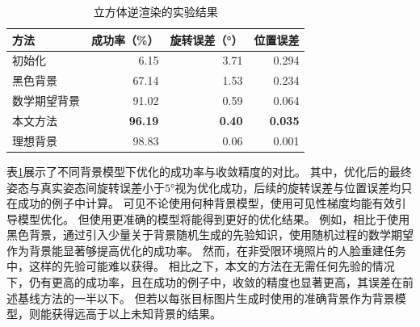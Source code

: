 \begin{table}
    \centering
    \caption{立方体逆渲染的实验结果}
    \label{tab:cube_opt}
    \begin{tabular}{l|rrr}
        \toprule
        方法       & 成功率（\%） & 旋转误差（°） & 位置误差 \\
        \midrule
        初始化      &  6.15 & 3.71 & 0.294 \\
        黑色背景    & 67.14 & 1.53 & 0.234 \\
        数学期望背景& 91.02 & 0.59 & 0.064 \\
        本文方法    & \textbf{96.19} & \textbf{0.40} & \textbf{0.035} \\
        \midrule
        理想背景    & 98.83 & 0.06 & 0.001 \\
        \bottomrule
    \end{tabular}
\end{table}
表\ref{tab:cube_opt}展示了不同背景模型下优化的成功率与收敛精度的对比。
其中，优化后的最终姿态与真实姿态间旋转误差小于$5°$视为优化成功，后续的旋转误差与位置误差均只在成功的例子中计算。
可见不论使用何种背景模型，使用可见性梯度均能有效引导模型优化。
但使用更准确的模型将能得到更好的优化结果。
例如，相比于使用黑色背景，通过引入少量关于背景随机生成的先验知识，使用随机过程的数学期望作为背景能显著够提高优化的成功率。
然而，在非受限环境照片的人脸重建任务中，这样的先验可能难以获得。
相比之下，本文的方法在无需任何先验的情况下，仍有更高的成功率，且在成功的例子中，收敛的精度也显著更高，其误差在前述基线方法的一半以下。
但若以每张目标图片生成时使用的准确背景作为背景模型，则能获得远高于以上未知背景的结果。

